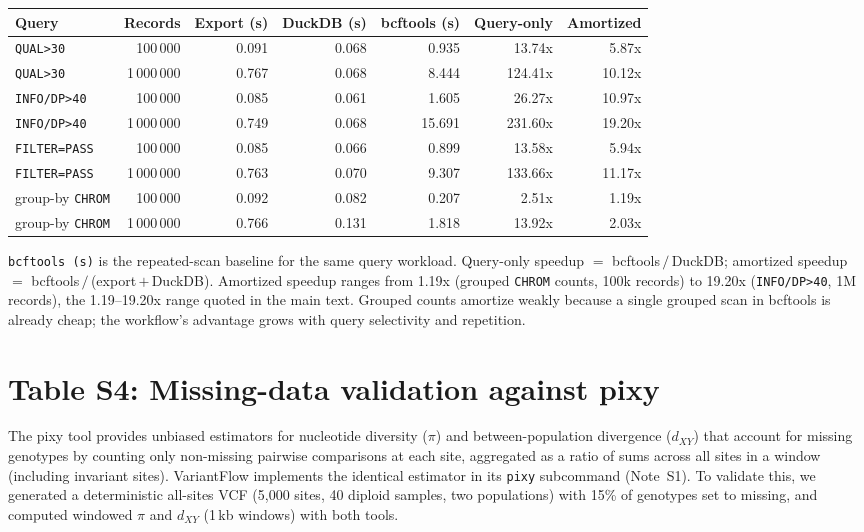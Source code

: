 \documentclass[11pt]{article}
\begin{document}
\begin{table}[ht]
\centering
\small
\begin{tabularx}{\linewidth}{Xrrrrrr}
\toprule
Query & Records & Export (s) & DuckDB (s) & bcftools (s) & Query-only & Amortized \\
\midrule
\texttt{QUAL>30}      & 100\,000    & 0.091 & 0.068 & 0.935  & 13.74x  & 5.87x  \\
\texttt{QUAL>30}      & 1\,000\,000 & 0.767 & 0.068 & 8.444  & 124.41x & 10.12x \\
\texttt{INFO/DP>40}   & 100\,000    & 0.085 & 0.061 & 1.605  & 26.27x  & 10.97x \\
\texttt{INFO/DP>40}   & 1\,000\,000 & 0.749 & 0.068 & 15.691 & 231.60x & 19.20x \\
\texttt{FILTER=PASS}  & 100\,000    & 0.085 & 0.066 & 0.899  & 13.58x  & 5.94x  \\
\texttt{FILTER=PASS}  & 1\,000\,000 & 0.763 & 0.070 & 9.307  & 133.66x & 11.17x \\
group-by \texttt{CHROM} & 100\,000    & 0.092 & 0.082 & 0.207  & 2.51x   & 1.19x  \\
group-by \texttt{CHROM} & 1\,000\,000 & 0.766 & 0.131 & 1.818  & 13.92x  & 2.03x  \\
\bottomrule
\end{tabularx}
\vspace{4pt}

\footnotesize{\texttt{bcftools (s)} is the repeated-scan baseline for the same
query workload. Query-only speedup $=$ bcftools\,$/$\,DuckDB; amortized speedup
$=$ bcftools\,$/$\,(export\,$+$\,DuckDB). Amortized speedup ranges from 1.19x
(grouped \texttt{CHROM} counts, 100k records) to 19.20x (\texttt{INFO/DP>40},
1M records), the 1.19--19.20x range quoted in the main text. Grouped counts
amortize weakly because a single grouped scan in bcftools is already cheap; the
workflow's advantage grows with query selectivity and repetition.}
\end{table}

\newpage
\section*{Table S4: Missing-data validation against pixy}

The pixy tool \citep{pixy2021} provides unbiased estimators for nucleotide
diversity ($\pi$) and between-population divergence ($d_{XY}$) that account
for missing genotypes by counting only non-missing pairwise comparisons at
each site, aggregated as a ratio of sums across all sites in a window
(including invariant sites). VariantFlow implements the identical estimator
in its \texttt{pixy} subcommand (Note~S1). To validate this, we generated a
deterministic all-sites VCF (5,000 sites, 40 diploid samples, two
populations) with 15\% of genotypes set to missing, and computed windowed
$\pi$ and $d_{XY}$ (1\,kb windows) with both tools.
\end{document}
